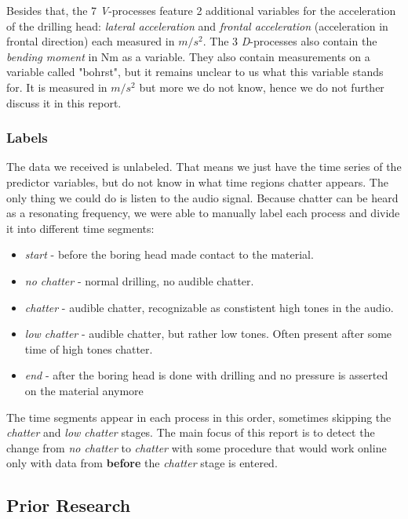 \documentclass[12 pt]{scrartcl}
\begin{document}
Besides that, the 7 \emph{V}-processes feature 2 additional variables for the acceleration of the drilling head: \emph{lateral acceleration} and \emph{frontal acceleration} (acceleration in frontal direction) each measured in $m/s^2$.
The 3 \emph{D}-processes also contain the \emph{bending moment} in Nm as a variable. They also contain measurements on a variable called "bohrst", but it remains unclear to us what this variable stands for. It is measured in $m/s^2$ but more we do not know, hence we do not further discuss it in this report.

\subsubsection{Labels} \label{labels}

The data we received is unlabeled. That means we just have the time series of the predictor variables, but do not know in what time regions chatter appears. The only thing we could do is listen to the audio signal. Because chatter can be heard as a resonating frequency, we were able to manually label each process and divide it into different time segments:

\begin{itemize}
  \item \emph{start} - before the boring head made contact to the material.
  \item \emph{no chatter} - normal drilling, no audible chatter.
  \item \emph{chatter} - audible chatter, recognizable as constistent high tones in the audio.
  \item \emph{low chatter} - audible chatter, but rather low tones. Often present after some time of high tones chatter.
  \item \emph{end} - after the boring head is done with drilling and no pressure is asserted on the material anymore
\end{itemize}

The time segments appear in each process in this order, sometimes skipping the \emph{chatter} and \emph{low chatter} stages.
The main focus of this report is to detect the change from \emph{no chatter} to \emph{chatter} with some procedure that would work online only with data from \textbf{before} the \emph{chatter} stage is entered.



\subsection{Prior Research}
\end{document}
